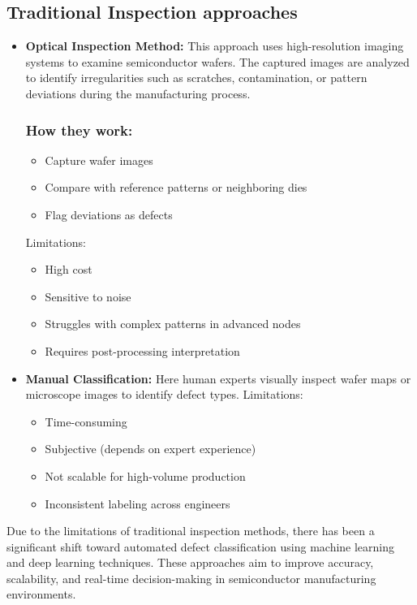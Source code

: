 \subsection{Traditional Inspection approaches}
\begin{itemize}
     \item \textbf{Optical Inspection Method:}
   This approach uses high-resolution imaging systems to examine semiconductor wafers. The captured images are analyzed to identify irregularities such as scratches, contamination, or pattern deviations during the manufacturing process.
    \subsubsection{How they work:}
     \begin{itemize} 
     \item Capture wafer images
     \item Compare with reference patterns or neighboring dies
     \item Flag deviations as defects
     \end{itemize}
      Limitations:
      \begin{itemize} 
      \item High cost
      \item Sensitive to noise
      \item Struggles with complex patterns in advanced nodes
      \item Requires post-processing interpretation
      \end{itemize}

     \item \textbf{Manual Classification:}  
       Here human experts visually inspect wafer maps or microscope images to identify defect types.
       Limitations:
       \begin{itemize} 
           \item Time-consuming
           \item Subjective (depends on expert experience)
            \item Not scalable for high-volume production
            \item Inconsistent labeling across engineers
       \end{itemize}
\end{itemize}
Due to the limitations of traditional inspection methods, there has been a significant shift toward automated defect classification using machine learning and deep learning techniques. These approaches aim to improve accuracy, scalability, and real-time decision-making in semiconductor manufacturing environments.

